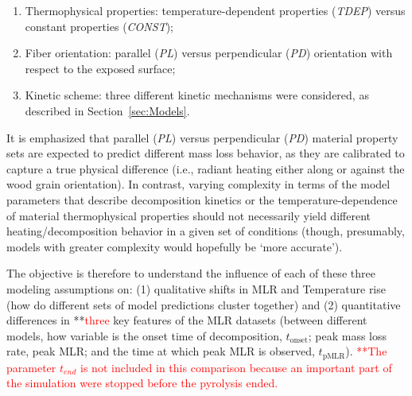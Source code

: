 \documentclass{article}
\begin{document}
\begin{enumerate} 
\item Thermophysical properties: temperature-dependent properties (\textit{TDEP}) versus constant properties (\textit{CONST}); 
\item Fiber orientation: parallel (\textit{PL}) versus perpendicular (\textit{PD}) orientation with respect to the exposed surface; 
\item Kinetic scheme: three different kinetic mechanisms were considered, as described in Section~\ref{sec:Models}. 
\end{enumerate} 

It is emphasized that parallel (\textit{PL}) versus perpendicular (\textit{PD}) material property sets are expected to predict different mass loss behavior, as they are calibrated to capture a true physical difference (i.e., radiant heating either along or against the wood grain orientation). In contrast, varying complexity in terms of the model parameters that describe decomposition kinetics or the temperature-dependence of material thermophysical properties should not necessarily yield different heating/decomposition behavior in a given set of conditions (though, presumably, models with greater complexity would hopefully be `more accurate').

The objective is therefore to understand the influence of each of these three modeling assumptions on: (1) qualitative shifts in MLR and Temperature rise (how do different sets of model predictions cluster together) and (2) quantitative differences in **\textcolor{red}{three} key features of the MLR datasets (between different models, how variable is the onset time of decomposition, $t_{\mathrm{onset}}$; peak mass loss rate, peak MLR; and the time at which peak MLR is observed, $t_{\mathrm{pMLR}}$). 
\textcolor{red}{**The parameter $t_{end}$ is not included in this comparison because an important part of the simulation were stopped before the pyrolysis ended.}\\
\end{document}
